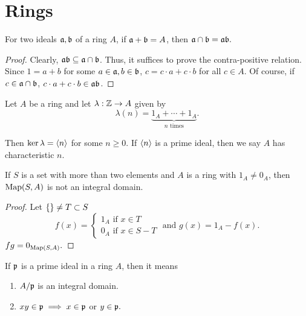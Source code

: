 \chapter{Rings}

\begin{proposition}
    For two ideals $\mathfrak{a}, \mathfrak{b}$ of a ring $A$, if $\mathfrak{a} + \mathfrak{b} = A$, then $\mathfrak{a} \cap \mathfrak{b} = \mathfrak{a} \mathfrak{b}.$
\end{proposition}
\begin{proof}
    Clearly, $\mathfrak{a}\mathfrak{b} \subseteq \mathfrak{a} \cap \mathfrak{b}$. Thus, it suffices to prove the contra-positive relation. Since $1 = a + b$ for some $a \in \mathfrak{a}, b \in \mathfrak{b}$,  $c = c\cdot a + c \cdot b$ for all $c \in A$. Of course, if $c \in \mathfrak{a}  \cap \mathfrak{b}$, $c\cdot a + c\cdot b \in \mathfrak{a} \mathfrak{b}$.
\end{proof}

Let $A$ be a ring and let $\lambda: \mathbb{Z} \to A$ given by
$$ \lambda(n) = \underset{n \text{ times}}{\underbrace{1_A + \cdots + 1_A}}.$$

Then $\ker \lambda = \langle n \rangle$ for some $n \geq 0$. If $\langle n \rangle$ is a prime ideal, then we say $A$ has  characteristic $n$. 

\begin{proposition}
    If $S$ is a set with more than two elements and $A$ is a ring with $1_A \neq 0_A$, then $\mathrm{Map}(S, A)$ is not an integral domain.
\end{proposition}

\begin{proof}
    Let $\{\} \neq T \subset S$
    $$f(x) = \begin{cases}
    1_A \text{ if } x \in  T \\
    0_A \text { if } x \in S - T       
    \end{cases} \text{ and } g(x) = 1_A - f(x).$$
$fg = 0_{\mathrm{Map}(S, A)}.$
\end{proof}

If $\mathfrak{p}$ is a prime ideal in a ring $A$, then it means
\begin{enumerate}
    \item $A/\mathfrak{p}$ is an integral domain.
    \item $xy \in \mathfrak{p} \implies x \in \mathfrak{p}$ or $y \in \mathfrak{p}.$
\end{enumerate}


